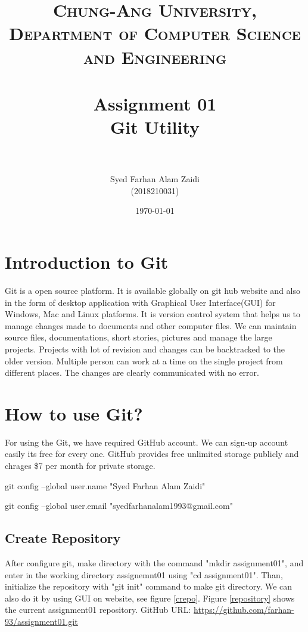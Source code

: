 \documentclass[paper=a4, fontsize=12pt]{scrartcl}
\title{	
\normalfont \normalsize 
\textsc{Chung-Ang University, Department of Computer Science and Engineering} \\ [25pt] %
\horrule{0.5pt} \\[0.4cm] %
\huge Assignment 01 \\
Git Utility\\  %
\horrule{1pt} \\[0.5cm] %
}
\author{Syed Farhan Alam Zaidi \\ (2018210031)} %
\date{\normalsize\today} %
\numberwithin{equation}{section} %
\numberwithin{figure}{section} %
\numberwithin{table}{section} %
\begin{document}
\maketitle %


\section{Introduction to Git}
\par Git is a open source platform. It is available globally on git hub website and also in the form of desktop application with Graphical User Interface(GUI) for Windows, Mac and Linux platforms.  It is version control system that helps us to manage changes made to documents and other computer files. We can maintain source files, documentations, short stories, pictures and manage the large projects. Projects with lot of revision and changes can be backtracked to the older version. Multiple person can work at a time on the single project from different places.  The changes are clearly communicated with no error.

\section{How to use Git?}
\par For using the Git, we have required GitHub account. We can sign-up account easily its free for every one. GitHub provides free unlimited storage publicly and chrages \$7 per month for private storage.  

   \par git config --global user.name "Syed Farhan Alam Zaidi"
   \par  git config --global user.email "syedfarhanalam1993@gmail.com"

\subsection{Create Repository}
\par After configure git, make directory with the command "mkdir assignment01", and enter in the working directory assignemnt01 using "cd assignment01". Than, initialize the repository with "git init" command to make git directory. We can also do it by using GUI on website, see figure \ref{crepo}.
Figure \ref{repository} shows the current assignment01 repository.
GitHub URL: \underline{ \url{https://github.com/farhan-93/assignment01.git}}
\end{document}
